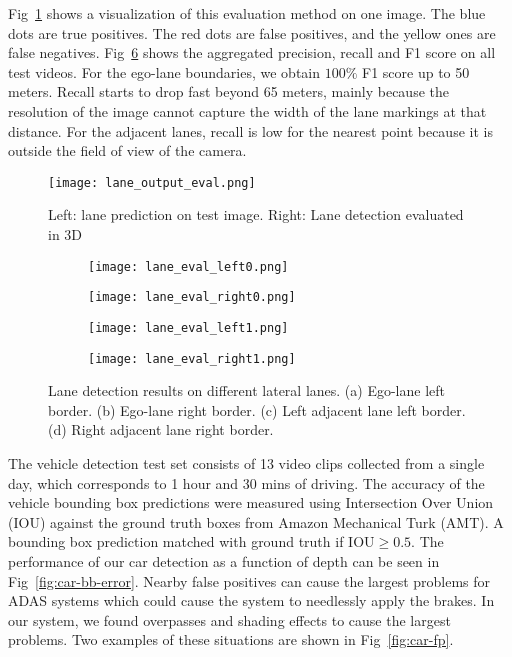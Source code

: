 \documentclass[journal]{IEEEtran}
\begin{document}
Fig~\ref{fig:lane-output-eval} shows a visualization of this evaluation method on one image. The blue dots are true positives. The red dots are false positives, and the yellow ones are false negatives. Fig~\ref{fig:lane-eval-plot} shows the aggregated precision, recall and F1 score on all test videos. For the ego-lane boundaries, we obtain $100\%$ F1 score up to 50 meters. Recall starts to drop fast beyond 65 meters, mainly because the resolution of the image cannot capture the width of the lane markings at that distance. For the adjacent lanes, recall is low for the nearest point because it is outside the field of view of the camera.

\begin{figure}[tb]
  \centering
    \texttt{[image: lane\_output\_eval.png]}
 \caption{Left: lane prediction on test image. Right: Lane detection evaluated in 3D}
 \label{fig:lane-output-eval}
\end{figure}

\begin{figure}[tb]
  \centering
    \begin{subfigure}[b]{1.6in}
      \texttt{[image: lane\_eval\_left0.png]}
      \caption{}
      \label{fig:lane-eval-left0}
    \end{subfigure}%
    \begin{subfigure}[b]{1.6in}
      \texttt{[image: lane\_eval\_right0.png]}
      \caption{}
      \label{fig:lane-eval-right0}
    \end{subfigure}%
    
    \begin{subfigure}[b]{1.6in}%
      \texttt{[image: lane\_eval\_left1.png]}
      \caption{}
      \label{fig:lane-eval-left1}
    \end{subfigure}%
    \begin{subfigure}[b]{1.6in}%
      \texttt{[image: lane\_eval\_right1.png]}
      \caption{}
      \label{fig:lane-eval-right1}
    \end{subfigure}%
 \caption{Lane detection results on different lateral lanes. (a) Ego-lane left border. (b) Ego-lane right border. (c) Left adjacent lane left border. (d) Right adjacent lane right border.}
 \label{fig:lane-eval-plot}
\end{figure}

The vehicle detection test set consists of 13 video clips collected from a single day, which corresponds to 1 hour and 30 mins of driving. The accuracy of the vehicle bounding box predictions were measured using Intersection Over Union (IOU) against the ground truth boxes from Amazon Mechanical Turk (AMT). A bounding box prediction matched with ground truth if IOU$\geq0.5$. The performance of our car detection as a function of depth can be seen in Fig~\ref{fig:car-bb-error}. Nearby false positives can cause the largest problems for ADAS systems which could cause the system to needlessly apply the brakes. In our system, we found overpasses and shading effects to cause the largest problems. Two examples of these situations are shown in Fig~\ref{fig:car-fp}.
\end{document}
